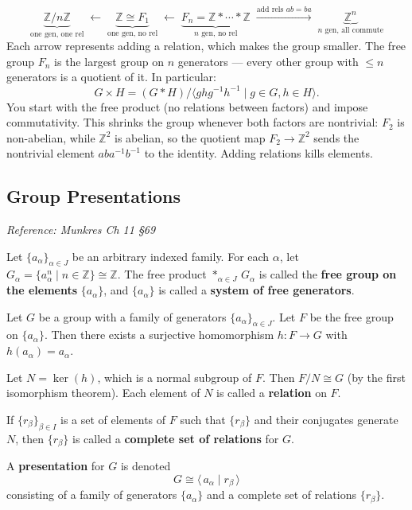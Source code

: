 \documentclass[11pt]{report}
\begin{document}
\begin{rembox}
\[\underbrace{\mathbb{Z}/n\mathbb{Z}}_{\text{one gen, one rel}} \;\longleftarrow\; \underbrace{\mathbb{Z} \cong F_1}_{\text{one gen, no rel}} \;\longleftarrow\; \underbrace{F_n = \mathbb{Z} * \cdots * \mathbb{Z}}_{\text{$n$ gen, no rel}} \;\overset{\text{add rels $ab = ba$}}{\longrightarrow}\; \underbrace{\mathbb{Z}^n}_{\text{$n$ gen, all commute}}\]
Each arrow represents adding a relation, which makes the group smaller. The free group $F_n$ is the largest group on $n$ generators --- every other group with $\leq n$ generators is a quotient of it. In particular:
\[G \times H = (G * H) / \langle ghg^{-1}h^{-1} \mid g \in G, h \in H \rangle.\]
You start with the free product (no relations between factors) and impose commutativity. This shrinks the group whenever both factors are nontrivial: $F_2$ is non-abelian, while $\mathbb{Z}^2$ is abelian, so the quotient map $F_2 \to \mathbb{Z}^2$ sends the nontrivial element $aba^{-1}b^{-1}$ to the identity. Adding relations kills elements.
\end{rembox}

\subsection{Group Presentations}

\textit{Reference: Munkres Ch 11 \S 69}

\begin{defbox}
Let $\{a_\alpha\}_{\alpha \in J}$ be an arbitrary indexed family. For each $\alpha$, let $G_\alpha = \{a_\alpha^n \mid n \in \mathbb{Z}\} \cong \mathbb{Z}$. The free product $*_{\alpha \in J}\, G_\alpha$ is called the \textbf{free group on the elements} $\{a_\alpha\}$, and $\{a_\alpha\}$ is called a \textbf{system of free generators}.
\end{defbox}

\begin{defbox}
Let $G$ be a group with a family of generators $\{a_\alpha\}_{\alpha \in J}$. Let $F$ be the free group on $\{a_\alpha\}$. Then there exists a surjective homomorphism $h: F \to G$ with $h(a_\alpha) = a_\alpha$.

Let $N = \ker(h)$, which is a normal subgroup of $F$. Then $F/N \cong G$ (by the first isomorphism theorem). Each element of $N$ is called a \textbf{relation} on $F$.

If $\{r_\beta\}_{\beta \in I}$ is a set of elements of $F$ such that $\{r_\beta\}$ and their conjugates generate $N$, then $\{r_\beta\}$ is called a \textbf{complete set of relations} for $G$.

A \textbf{presentation} for $G$ is denoted
\[G \cong \langle\, a_\alpha \mid r_\beta \,\rangle\]
consisting of a family of generators $\{a_\alpha\}$ and a complete set of relations $\{r_\beta\}$.
\end{defbox}
\end{document}
